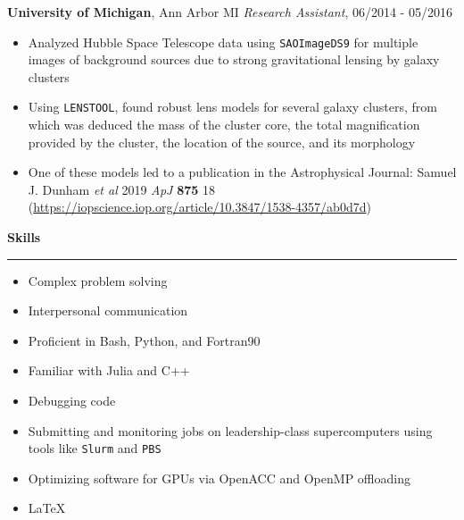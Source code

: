 \documentclass[10pt]{article}
\begin{document}
\textbf{University of Michigan}, Ann Arbor MI\newline
\textit{Research Assistant}, 06/2014 - 05/2016
\begin{itemize}\setlength\itemsep{0.1cm}
  \item
    Analyzed Hubble Space Telescope data using \texttt{SAOImageDS9}
    for multiple images of
    background sources due to strong gravitational lensing by galaxy clusters
  \item
    Using \texttt{LENSTOOL},
    found robust lens models for several galaxy clusters,
    from which was deduced the mass of the cluster core,
    the total magnification provided by the cluster,
    the location of the source, and its morphology
  \item
    One of these models led to a publication in the Astrophysical Journal:
    Samuel J. Dunham \textit{et al} 2019 \textit{ApJ} \textbf{875} 18
    (\url{https://iopscience.iop.org/article/10.3847/1538-4357/ab0d7d})
\end{itemize}
\vspace{1em}

\textbf{Skills}\vspace{0.5em}\hrule

\begin{itemize}\setlength\itemsep{0.1cm}
  \item
    Complex problem solving
  \item
    Interpersonal communication
  \item
    Proficient in Bash, Python, and Fortran90
  \item
    Familiar with Julia and C++
  \item
    Debugging code
  \item
    Submitting and monitoring jobs
    on leadership-class supercomputers using tools like \texttt{Slurm}
    and \texttt{PBS}
  \item
    Optimizing software for GPUs via OpenACC and OpenMP offloading
  \item
    LaTeX
\end{itemize}
\end{document}
